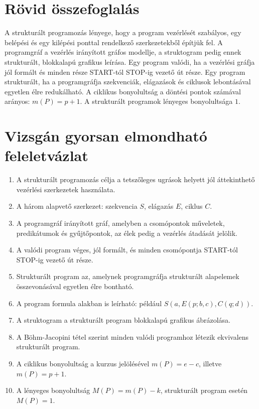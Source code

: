 \section{Rövid összefoglalás}

\begin{summarybox}
A strukturált programozás lényege, hogy a program vezérlését szabályos, egy belépési és egy kilépési ponttal rendelkező szerkezetekből építjük fel. A programgráf a vezérlés irányított gráfos modellje, a struktogram pedig ennek strukturált, blokkalapú grafikus leírása. Egy program valódi, ha a vezérlési gráfja jól formált és minden része START-tól STOP-ig vezető út része. Egy program strukturált, ha a programgráfja szekvenciák, elágazások és ciklusok lebontásával egyetlen élre redukálható. A ciklikus bonyolultság a döntési pontok számával arányos: $m(P)=p+1$. A strukturált programok lényeges bonyolultsága $1$.
\end{summarybox}

\section{Vizsgán gyorsan elmondható feleletvázlat}

\begin{enumerate}
  \item A strukturált programozás célja a tetszőleges ugrások helyett jól áttekinthető vezérlési szerkezetek használata.
  \item A három alapvető szerkezet: szekvencia $S$, elágazás $E$, ciklus $C$.
  \item A programgráf irányított gráf, amelyben a csomópontok műveletek, predikátumok és gyűjtőpontok, az élek pedig a vezérlés átadását jelölik.
  \item A valódi program véges, jól formált, és minden csomópontja START-tól STOP-ig vezető út része.
  \item Strukturált program az, amelynek programgráfja strukturált alapelemek összevonásával egyetlen élre bontható.
  \item A program formula alakban is leírható: például $S(a,E(p;b,c),C(q;d))$.
  \item A struktogram a strukturált program blokkalapú grafikus ábrázolása.
  \item A Böhm-Jacopini tétel szerint minden valódi programhoz létezik ekvivalens strukturált program.
  \item A ciklikus bonyolultság a kurzus jelölésével $m(P)=e-c$, illetve $m(P)=p+1$.
  \item A lényeges bonyolultság $M(P)=m(P)-k$, strukturált program esetén $M(P)=1$.
\end{enumerate}
